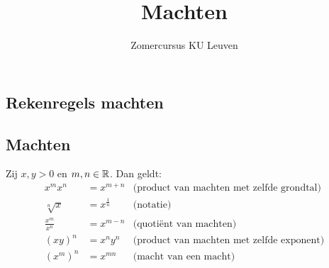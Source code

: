 \documentclass{ximera}
\author{Zomercursus KU Leuven}
\title[Rekenvaardigheden:]{Machten}
\begin{document}
\begin{abstract}
	
\end{abstract}
\maketitle

\subsection{Rekenregels machten}\label{machtenrekenregels}

\begin{proposition}
	
\subsection{Machten}
Zij $x,y>0$ en $m,n\in\mathbb R$. Dan geldt:
\begin{align*}
	x^{m}x^{n}          &= x^{m+n}     & \text{(product van machten met zelfde grondtal)}\\
	\sqrt[n] x          &= x^{\frac1n}  & \text{(notatie)}\\
	\frac{x^{m}}{x^{n}} &= x^{m-n}      & \text{(quotiënt van machten)} \\
	(xy)^n              &= x^ny^n      & \text{(product van machten met zelfde exponent)}\\
	\left(x^{m}\right)^{n}&= x^{mn}    & \text{(macht van een macht)}\\	
\end{align*}
\end{proposition}
\end{document}
